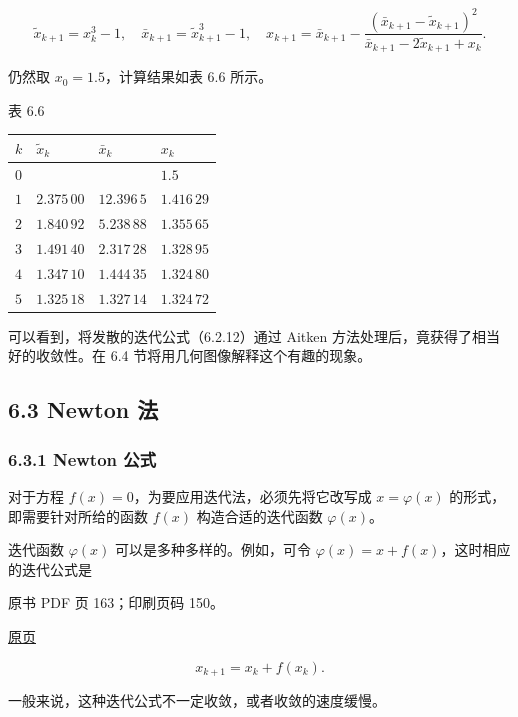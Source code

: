 \[
\tilde{x}_{k+1}=x_k^3-1,\quad
\bar{x}_{k+1}=\tilde{x}_{k+1}^3-1,\quad
x_{k+1}=\bar{x}_{k+1}-\frac{(\bar{x}_{k+1}-\tilde{x}_{k+1})^2}{\bar{x}_{k+1}-2\tilde{x}_{k+1}+x_k}.
\]

仍然取 \(x_0=1.5\)，计算结果如表 6.6 所示。

表 6.6

{\def\LTcaptype{none} %
\begin{longtable}[]{@{}llll@{}}
\toprule\noalign{}
\(k\) & \(\tilde{x}_k\) & \(\bar{x}_k\) & \(x_k\) \\
\midrule\noalign{}
\endhead
\bottomrule\noalign{}
\endlastfoot
\(0\) & & & \(1.5\) \\
\(1\) & \(2.375\,00\) & \(12.396\,5\) & \(1.416\,29\) \\
\(2\) & \(1.840\,92\) & \(5.238\,88\) & \(1.355\,65\) \\
\(3\) & \(1.491\,40\) & \(2.317\,28\) & \(1.328\,95\) \\
\(4\) & \(1.347\,10\) & \(1.444\,35\) & \(1.324\,80\) \\
\(5\) & \(1.325\,18\) & \(1.327\,14\) & \(1.324\,72\) \\
\end{longtable}
}

可以看到，将发散的迭代公式（6.2.12）通过 Aitken 方法处理后，竟获得了相当好的收敛性。在 6.4 节将用几何图像解释这个有趣的现象。

\subsection{6.3 Newton 法}\label{ch06-newton-ux6cd5}

\subsubsection{6.3.1 Newton 公式}\label{ch06-newton-ux516cux5f0f}

对于方程 \(f(x)=0\)，为要应用迭代法，必须先将它改写成 \(x=\varphi(x)\) 的形式，即需要针对所给的函数 \(f(x)\) 构造合适的迭代函数 \(\varphi(x)\)。

迭代函数 \(\varphi(x)\) 可以是多种多样的。例如，可令 \(\varphi(x)=x+f(x)\)，这时相应的迭代公式是

\clearpage

原书 PDF 页 163；印刷页码 150。

\href{source-images/pdf-163.jpeg}{原页}

\[
x_{k+1}=x_k+f(x_k).
\tag{6.3.1}
\]

一般来说，这种迭代公式不一定收敛，或者收敛的速度缓慢。

